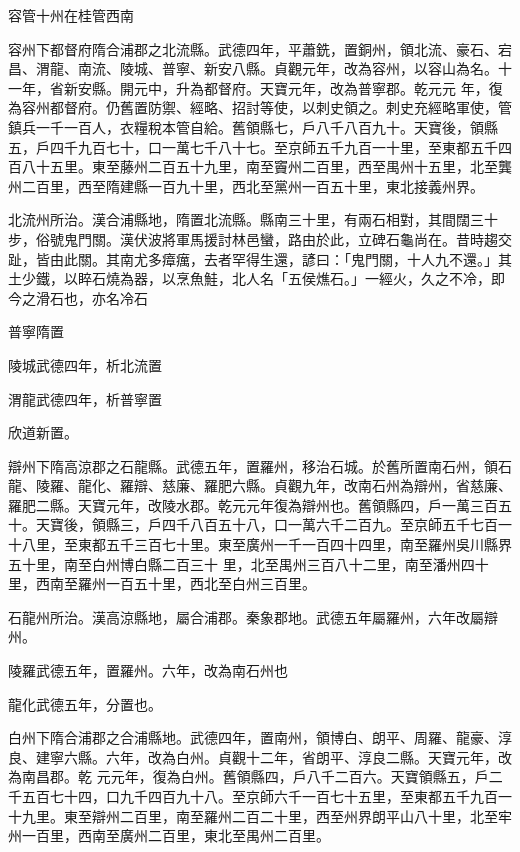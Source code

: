 \begin{pinyinscope}
 容管十州在桂管西南



 容州下都督府隋合浦郡之北流縣。武德四年，平蕭銑，置銅州，領北流、豪石、宕昌、渭龍、南流、陵城、普寧、新安八縣。貞觀元年，改為容州，以容山為名。十一年，省新安縣。開元中，升為都督府。天寶元年，改為普寧郡。乾元元
 年，復為容州都督府。仍舊置防禦、經略、招討等使，以刺史領之。刺史充經略軍使，管鎮兵一千一百人，衣糧稅本管自給。舊領縣七，戶八千八百九十。天寶後，領縣五，戶四千九百七十，口一萬七千八十七。至京師五千九百一十里，至東都五千四百八十五里。東至藤州二百五十九里，南至竇州二百里，西至禺州十五里，北至龔州二百里，西至隋建縣一百九十里，西北至黨州一百五十里，東北接義州界。



 北流州所治。漢合浦縣地，隋置北流縣。縣南三十里，有兩石相對，其間闊三十步，俗號鬼門關。漢伏波將軍馬援討林邑蠻，路由於此，立碑石龜尚在。昔時趨交趾，皆由此關。其南尤多瘴癘，去者罕得生還，諺曰：「鬼門關，十人九不還。」其土少鐵，以睟石燒為器，以烹魚鮭，北人名「五侯燋石。」一經火，久之不冷，即今之滑石也，亦名冷石



 普寧隋置



 陵城武德四年，析北流置



 渭龍武德四年，析普寧置



 欣道新置。



 辯州下隋高涼郡之石龍縣。武德五年，置羅州，移治石城。於舊所置南石州，領石龍、陵羅、龍化、羅辯、慈廉、羅肥六縣。貞觀九年，改南石州為辯州，省慈廉、羅肥二縣。天寶元年，改陵水郡。乾元元年復為辯州也。舊領縣四，戶一萬三百五十。天寶後，領縣三，戶四千八百五十八，口一萬六千二百九。至京師五千七百一十八里，至東都五千三百七十里。東至廣州一千一百四十四里，南至羅州吳川縣界五十里，南至白州博白縣二百三十
 里，北至禺州三百八十二里，南至潘州四十里，西南至羅州一百五十里，西北至白州三百里。



 石龍州所治。漢高涼縣地，屬合浦郡。秦象郡地。武德五年屬羅州，六年改屬辯州。



 陵羅武德五年，置羅州。六年，改為南石州也



 龍化武德五年，分置也。



 白州下隋合浦郡之合浦縣地。武德四年，置南州，領博白、朗平、周羅、龍豪、淳良、建寧六縣。六年，改為白州。貞觀十二年，省朗平、淳良二縣。天寶元年，改為南昌郡。乾
 元元年，復為白州。舊領縣四，戶八千二百六。天寶領縣五，戶二千五百七十四，口九千四百九十八。至京師六千一百七十五里，至東都五千九百一十九里。東至辯州二百里，南至羅州二百二十里，西至州界朗平山八十里，北至牢州一百里，西南至廣州二百里，東北至禺州二百里。




\end{pinyinscope}

